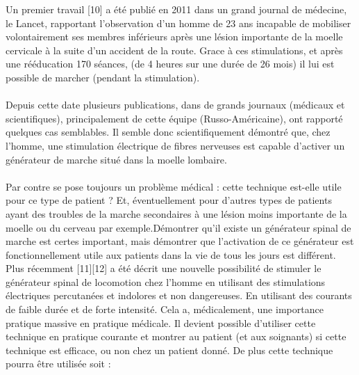 \documentclass{report}
\begin{document}
Un premier travail [10] a \'{e}t\'{e} publi\'{e} en 2011 dans un grand journal de m\'{e}decine, le Lancet,
rapportant l'observation d'un homme de 23 ans incapable de mobiliser volontairement ses
membres inf\'{e}rieurs apr\`{e}s une l\'{e}sion importante de la moelle cervicale \`{a} la suite d'un
accident de la route. Grace \`{a} ces stimulations, et apr\`{e}s une r\'{e}\'{e}ducation 170 s\'{e}ances, (de 4
heures sur une dur\'{e}e de 26 mois) il lui est possible de marcher (pendant la stimulation).\\ \\

Depuis cette date plusieurs publications, dans de grands journaux (m\'{e}dicaux et
scientifiques), principalement de cette \'{e}quipe (Russo-Am\'{e}ricaine), ont rapport\'{e} quelques
cas semblables. Il semble donc scientifiquement d\'{e}montr\'{e} que, chez l'homme, une
stimulation \'{e}lectrique de fibres nerveuses est capable d'activer un g\'{e}n\'{e}rateur de marche
situ\'{e} dans la moelle lombaire.\\ \\

Par contre se pose toujours un probl\`{e}me m\'{e}dical : cette technique est-elle utile pour ce type
de patient ? Et, \'{e}ventuellement pour d'autres types de patients ayant des troubles de la
marche secondaires \`{a} une l\'{e}sion moins importante de la moelle ou du cerveau par exemple.D\'{e}montrer qu'il existe un g\'{e}n\'{e}rateur spinal de marche est certes important, mais d\'{e}montrer
que l'activation de ce g\'{e}n\'{e}rateur est fonctionnellement utile aux patients dans la vie de tous
les jours est diff\'{e}rent. \\

Plus r\'ecemment [11][12] a \'et\'e d\'ecrit une nouvelle possibilit\'e de stimuler le g\'en\'erateur spinal de 
locomotion 
chez l'homme en utilisant des stimulations \'electriques percutan\'ees et indolores et non dangereuses. En utilisant 
des courants  de faible dur\'ee et de forte intensit\'e. Cela a, m\'edicalement, une importance pratique massive en 
pratique m\'edicale. Il devient possible d'utiliser cette technique en pratique courante et montrer au patient (et aux 
soignants) si cette technique est efficace, ou non chez un patient donn\'e. 
De plus cette technique pourra \^etre utilis\'ee soit :
  
\end{document}

